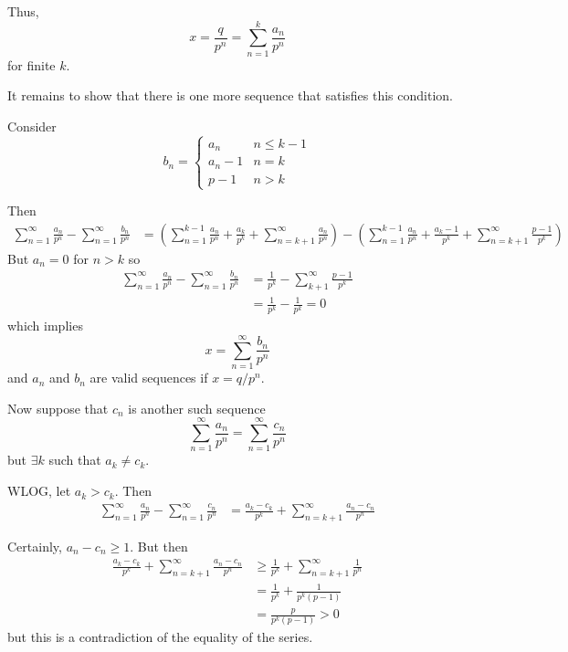 \documentclass[12pt]{article}
\begin{document}
        Thus,
        \[x = \frac{q}{p^n} = \sum_{n=1}^k \frac{a_n}{p^n}\]
        for finite $k$. 

        It remains to show that there is one more sequence that satisfies this condition.

        Consider 
        \[b_n = \begin{cases}
            a_n & n \leq k - 1\\
            a_n - 1 & n = k\\
            p - 1 & n > k
        \end{cases}\]

        Then 
        \begin{align*}
            \sum_{n=1}^{\infty} \frac{a_n}{p^n}- \sum_{n=1}^{\infty} \frac{b_n}{p^n} &= \left(\sum_{n=1}^{k-1} \frac{a_n}{p^n} + \frac{a_k}{p^k} + \sum_{n=k+1}^{\infty} \frac{a_n}{p^n}\right) - \left(\sum_{n=1}^{k-1} \frac{a_n}{p^n} + \frac{a_k - 1}{p^k} + \sum_{n=k+1}^{\infty} \frac{p - 1}{p^k}\right)
        \end{align*}
        But $a_n = 0$ for $n > k$ so 
        \begin{align*}
            \sum_{n=1}^{\infty} \frac{a_n}{p^n}- \sum_{n=1}^{\infty} \frac{b_n}{p^n} &= \frac{1}{p^k} - \sum_{k+1}^{\infty} \frac{p - 1}{p^k}\\ 
            &= \frac{1}{p^k} - \frac{1}{p^k} = 0
        \end{align*}
        which implies 
        \[x = \sum_{n=1}^{\infty} \frac{b_n}{p^n}\]
        and $a_n$ and $b_n$ are valid sequences if $x = q/p^n$.

        Now suppose that $c_n$ is another such sequence
        \[\sum_{n=1}^{\infty} \frac{a_n}{p^n} = \sum_{n=1}^{\infty} \frac{c_n}{p^n}\]
        but $\exists k$ such that $a_k \neq c_k$. 
        
        WLOG, let $a_k > c_k$. Then
        \begin{align*}
            \sum_{n=1}^{\infty} \frac{a_n}{p^n}- \sum_{n=1}^{\infty} \frac{c_n}{p^n} &= \frac{a_k - c_k}{p^k} + \sum_{n=k+1}^{\infty} \frac{a_n - c_n}{p^n}
        \end{align*} 

        Certainly, $a_n - c_n \geq 1$. But then 
        \begin{align*}
            \frac{a_k - c_k}{p^k} + \sum_{n=k+1}^{\infty} \frac{a_n - c_n}{p^n} &\geq \frac{1}{p^k} + \sum_{n=k+1}^{\infty} \frac{1}{p^n}\\
            &= \frac{1}{p^k} + \frac{1}{p^k(p-1)}\\
            &= \frac{p}{p^k(p-1)} > 0
        \end{align*}
        but this is a contradiction of the equality of the series.
        
\end{document}
